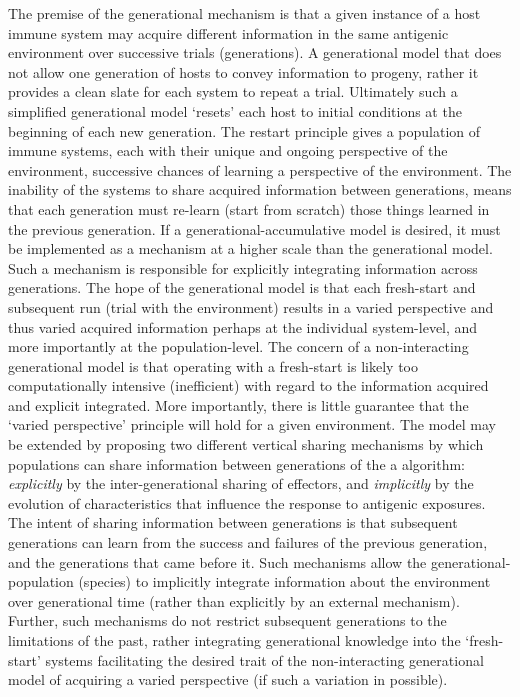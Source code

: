 The premise of the generational mechanism is that a given instance of a host immune system may acquire different information in the same antigenic environment over successive trials (generations). A generational model that does not allow one generation of hosts to convey information to progeny, rather it provides a clean slate for each system to repeat a trial. Ultimately such a simplified generational model `resets' each host to initial conditions at the beginning of each new generation. The restart principle gives a population of immune systems, each with their unique and ongoing perspective of the environment, successive chances of learning a perspective of the environment. The inability of the systems to share acquired information between generations, means that each generation must re-learn (start from scratch) those things learned in the previous generation. If a generational-accumulative model is desired, it must be implemented as a mechanism at a higher scale than the generational model. Such a mechanism is responsible for explicitly integrating information across generations. The hope of the generational model is that each fresh-start and subsequent run (trial with the environment) results in a varied perspective and thus varied acquired information perhaps at the individual system-level, and more importantly at the population-level.
The concern of a non-interacting generational model is that operating with a fresh-start is likely too computationally intensive (inefficient) with regard to the information acquired and explicit integrated. More importantly, there is little guarantee that the `varied perspective' principle will hold for a given environment. The model may be extended by proposing two different vertical sharing mechanisms by which populations can share information between generations of the a algorithm: \emph{explicitly} by the inter-generational sharing of effectors, and \emph{implicitly} by the evolution of characteristics that influence the response to antigenic exposures. The intent of sharing information between generations is that subsequent generations can learn from the success and failures of the previous generation, and the generations that came before it. Such mechanisms allow the generational-population (species) to implicitly integrate information about the environment over generational time (rather than explicitly by an external mechanism). Further, such mechanisms do not restrict subsequent generations to the limitations of the past, rather integrating generational knowledge into the `fresh-start' systems facilitating the desired trait of the non-interacting generational model of acquiring a varied perspective (if such a variation in possible).

